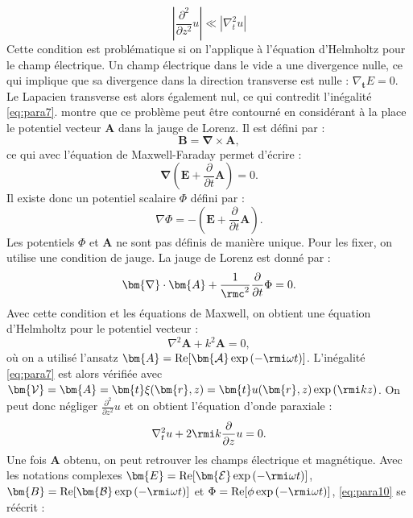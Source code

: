\begin{equation}
\left|\frac{\partial^2}{\partial z^2} u\right|\ll\left|\nabla_t^2 u \right|
\label{eq:para7}
\end{equation}
Cette condition est problématique si on l'applique à l'équation d'Helmholtz pour le champ électrique. Un champ électrique dans le vide a une divergence nulle, ce qui implique que sa divergence dans la direction transverse est nulle : $\nabla_{\bm{t}} E=0$. Le Lapacien transverse est alors également nul, ce qui contredit l'inégalité \ref{eq:para7}.  montre que ce problème peut être contourné en considérant à la place le potentiel vecteur $\bm{A}$ dans la jauge de Lorenz. Il est défini par :
\begin{equation}
\bm{B} = \bm{\nabla}\times\bm{A},
\label{eq:para8}
\end{equation}
ce qui avec l'équation de Maxwell-Faraday permet d'écrire : 
\begin{equation}
\bm{\nabla}\left(\bm{E}+\frac{\partial}{\partial t}\bm{A}\right) = 0.
\label{eq:para9}
\end{equation}
Il existe donc un potentiel scalaire $\Phi$ défini par :
\begin{equation}
\nabla\Phi=-\left(\bm{E}+\frac{\partial}{\partial t}\bm{A}\right).
\label{eq:para10}
\end{equation}
Les potentiels $\Phi$ et $\bm{A}$ ne sont pas définis de manière unique. Pour les fixer, on utilise une condition de jauge. La jauge de Lorenz est donné par :
\begin{equation}
\bm{\nabla}\cdot\bm{A}+\frac{1}{\rmc^2}\frac{\partial}{\partial t}\Phi=0.
\label{eq:para11}
\end{equation}
Avec cette condition et les équations de Maxwell, on obtient une équation d'Helmholtz pour le potentiel vecteur :
\begin{equation*}
\nabla^2\bm{A}+k^2\bm{A}=0,
\label{eq:para12}
\end{equation*}
où on a utilisé l'ansatz $\bm{A}=\text{Re}[\bm{\mathcal{A}}\exp{(-\rmi\omega t)}]$. L'inégalité \ref{eq:para7} est alors vérifiée avec $\bm{\mathcal{V}} = \bm{A}=\bm{t}\xi(\bm{r},z)=\bm{t}u(\bm{r},z)\exp{(\rmi k z)}$. On peut donc négliger $\frac{\partial^2}{\partial z^2} u$ et on obtient l'équation d'onde paraxiale :
\begin{equation}
\nabla_t^2 u+2\rmi k\frac{\partial}{\partial z}{u}=0.
\label{eq:para13}
\end{equation}
Une fois $\bm{A}$ obtenu, on peut retrouver les champs électrique et magnétique. Avec les notations complexes $\bm{E}=\text{Re}[\bm{\mathcal{E}}\exp{(-\rmi\omega t)}]$, $\bm{B}=\text{Re}[\bm{\mathcal{B}}\exp{(-\rmi\omega t)}]$ et $\Phi=\text{Re}[\phi\exp{(-\rmi\omega t)}]$, \ref{eq:para10} se réécrit :
